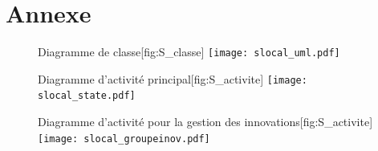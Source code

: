 \section{Annexe}
\label{sec:annexe}

\begin{figure}[!htbp]
\begin{sidecaption}[fortoc]{Diagramme de classe}[fig:S_classe]
  \centering
 \texttt{[image: slocal\_uml.pdf]}
  \end{sidecaption}
\end{figure}

\begin{figure}[!htbp]
\begin{sidecaption}[fortoc]{Diagramme d'activité principal}[fig:S_activite]
  \centering
 \texttt{[image: slocal\_state.pdf]}
  \end{sidecaption}
\end{figure}

\begin{figure}[!htbp]
\begin{sidecaption}[fortoc]{Diagramme d'activité pour la gestion des innovations}[fig:S_activite]
  \centering
 \texttt{[image: slocal\_groupeinov.pdf]}
  \end{sidecaption}
\end{figure}

\printbibliography[heading=subbibliography]


